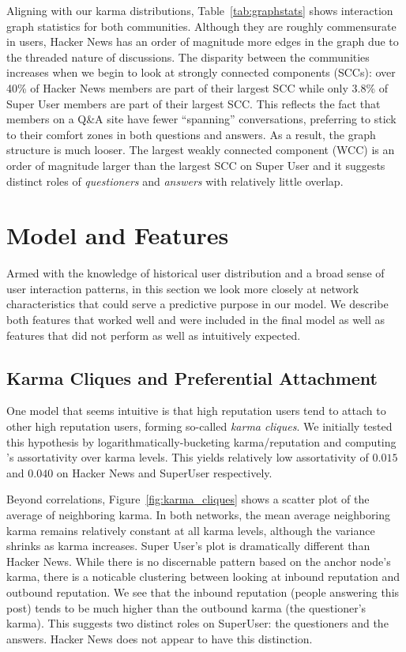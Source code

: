 \documentclass[11pt]{article}
\begin{document}
Aligning with our karma distributions, Table~\ref{tab:graphstats} shows
interaction graph statistics for both communities. Although they are roughly
commensurate in users, Hacker News has an order of magnitude more edges in the
graph due to the threaded nature of discussions. The disparity between the
communities increases when we begin to look at strongly connected components
(SCCs): over 40\% of Hacker News members are part of their largest SCC while
only 3.8\% of Super User members are part of their largest SCC\@. This reflects
the fact that members on a Q\&A site have fewer ``spanning'' conversations,
preferring to stick to their comfort zones in both questions and answers. As a
result, the graph structure is much looser. The largest weakly connected
component (WCC) is an order of magnitude larger than the largest SCC on Super
User and it suggests distinct roles of \textit{questioners} and \textit{answers}
with relatively little overlap.

\section{Model and Features}
\label{sec:model}

Armed with the knowledge of historical user distribution and a broad sense of
user interaction patterns, in this section we look more closely at network
characteristics that could serve a predictive purpose in our model. We describe
both features that worked well and were included in the final model as well as
features that did not perform as well as intuitively expected.

\subsection{Karma Cliques and Preferential Attachment}
\label{sec:karma_cliques}

One model that seems intuitive is that high reputation users tend to attach to
other high reputation users, forming so-called \textit{karma cliques}. We
initially tested this hypothesis by logarithmatically-bucketing karma/reputation
and computing \citet{newman2003mixing}'s assortativity over karma levels. This
yields relatively low assortativity of $0.015$ and $0.040$ on Hacker News and
SuperUser respectively.

Beyond correlations, Figure~\ref{fig:karma_cliques} shows a scatter plot of the
average of neighboring karma. In both networks, the mean average neighboring
karma remains relatively constant at all karma levels, although the variance
shrinks as karma increases.  Super User's plot is dramatically different than
Hacker News. While there is no discernable pattern based on the anchor node's
karma, there is a noticable clustering between looking at inbound reputation and
outbound reputation. We see that the inbound reputation (people answering this
post) tends to be much higher than the outbound karma (the questioner's karma).
This suggests two distinct roles on SuperUser: the questioners and the answers.
Hacker News does not appear to have this distinction.
\end{document}
